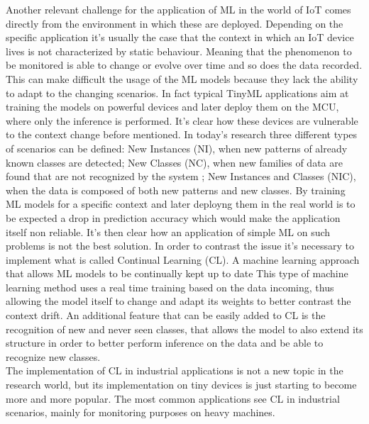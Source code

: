 \documentclass[12pt]{report}
\begin{document}
Another relevant challenge for the application of ML in the world of IoT comes directly from the environment in which these are deployed. Depending on the specific application it's usually the case that the context in which an IoT device lives is not characterized by static behaviour. Meaning that the phenomenon to be monitored is able to change or evolve over time and so does the data recorded. This can make difficult the usage of the ML models because they lack the ability to adapt to the changing scenarios. In fact typical TinyML applications aim at training the models on powerful devices and later deploy them on the MCU, where only the inference is performed. It's clear how these devices are vulnerable to the context change before mentioned. In today's research three different types of scenarios can be defined: New Instances (NI), when new patterns of already known classes are detected; New Classes (NC), when new families of data are found that are not recognized by the system ; New Instances and Classes (NIC), when the data is composed of both new patterns and new classes.
By training ML models for a specific context and later deployng them in the real world is to be expected a drop in prediction accuracy which would make the application itself non reliable. It's then clear how an application of simple ML on such problems is not the best solution. In order to contrast the issue it's necessary to implement what is called Continual Learning (CL). A machine learning approach that allows ML models to be continually kept up to date
This type of machine learning method uses a real time training based on the data incoming, thus allowing the model itself to change and adapt its weights to better contrast the context drift. An additional feature that can be easily added to CL is the recognition of new and never seen classes, that allows the model to also extend its structure in order to better perform inference on the data and be able to recognize new classes. \\
The implementation of CL in industrial applications is not a new topic in the research world, but its implementation on tiny devices is just starting to become more and more popular. The most common applications see CL in industrial scenarios, mainly for monitoring purposes on heavy machines.
\end{document}
